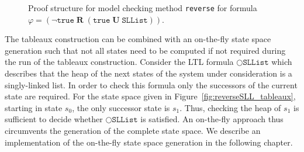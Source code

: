\documentclass[a4paper, 12pt, twoside]{report}
\begin{document}
\begin{figure}
\begin{center}
{}
			\caption{Proof structure for model checking method \texttt{reverse} for formula $\varphi=(\neg\texttt{true}\;\textbf{R}\;(\texttt{true}\;\textbf{U}\;\texttt{SLList}))$.}\label{fig:tableaux_ps}
		\end{center}
	\end{figure}
	
	The tableaux construction can be combined with an on-the-fly state space generation such that not all states need to be computed if not required during the run of the tableaux construction. Consider the LTL formula $\bigcirc \texttt{SLList}$ which describes that the heap of the next states of the system under consideration is a singly-linked list. In order to check this formula only the successors of the current state are required. For the state space given in Figure~\ref{fig:reverseSLL_tableaux}, starting in state $s_0$, the only successor state is $s_1$. Thus, checking the heap of $s_1$ is sufficient to decide whether $\bigcirc \texttt{SLList}$ is satisfied. An on-the-fly approach thus circumvents the generation of the complete state space. We describe an implementation of the on-the-fly state space generation in the following chapter.
	
\end{document}
